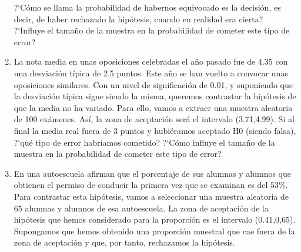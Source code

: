 \begin{adjustwidth}{20pt}{10pt}
\begin{enumerate}[PB. 1. ]
?`Cómo se llama la probabilidad de habernos equivocado es la decisión, es decir, de haber rechazado la hipótesis, cuando en realidad era cierta? ?`Influye el tamaño de la muestra en la probabilidad de cometer este tipo de error? 

\hspace{-15mm}

\hspace{-15mm}\vspace{1cm}



\item La nota media en unas oposiciones celebradas el año pasado fue de 4.35 con una desviación típica de 2.5 puntos. Este año se han vuelto a convocar unas oposiciones similares. Con un nivel de significación de 0.01, y suponiendo que la desviación típica sigue siendo la misma, queremos contrastar la hipótesis de que la media no ha variado. Para ello, vamos a extraer una muestra aleatoria de 100 exámenes. Así, la zona de aceptación será el intervalo (3.71,4.99). Si al final la media real fuera de 3 puntos y hubiéramos aceptado H0 (siendo falsa), ?`qué tipo de error habríamos cometido? ?`Cómo influye el tamaño de la muestra en la probabilidad de cometer este tipo de error? 

\hspace{-15mm}

\hspace{-15mm}\vspace{1cm}



\item En una autoescuela afirman que el porcentaje de sus alumnas y alumnos que obtienen el permiso de conducir la primera vez que se examinan es del 53\%. Para contrastar esta hipótesis, vamos a seleccionar una muestra aleatoria de 65 alumnas y alumnos de esa autoescuela. La zona de aceptación de la hipótesis que hemos considerado para la proporción es el intervalo (0.41,0,65). Supongamos que hemos obtenido una proporción muestral que cae fuera de la zona de aceptación y que, por tanto, rechazamos la hipótesis. 


\end{enumerate}
\end{adjustwidth}
